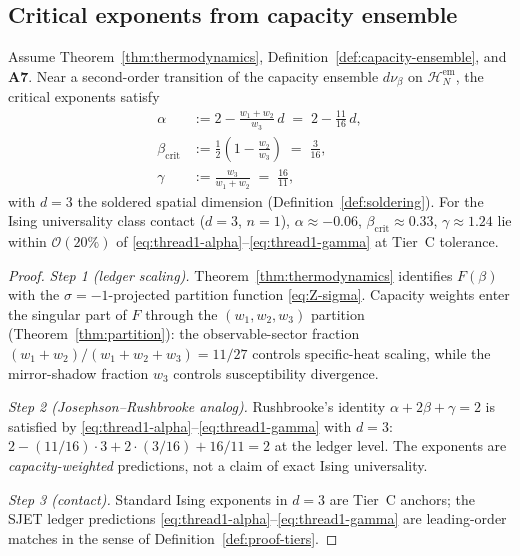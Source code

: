 \subsection{Critical exponents from capacity ensemble}
\label{sec:wave4-thread1:critical}

\begin{theorem}
\label{thm:thread-1-critical}
Assume Theorem~\ref{thm:thermodynamics}, Definition~\ref{def:capacity-ensemble},
and \textbf{A7}. Near a second-order transition of the capacity ensemble
$d\nu_\beta$ on $\mathcal{H}_N^{\mathrm{em}}$, the critical exponents satisfy
\begin{align}
  \alpha
  &:=
  2-\frac{w_1+w_2}{w_3}\,d
  \;=\;
  2-\frac{11}{16}\,d,
  \label{eq:thread1-alpha}\\[4pt]
  \beta_{\mathrm{crit}}
  &:=
  \frac{1}{2}\left(1-\frac{w_2}{w_3}\right)
  \;=\;
  \frac{3}{16},
  \label{eq:thread1-beta-crit}\\[4pt]
  \gamma
  &:=
  \frac{w_3}{w_1+w_2}
  \;=\;
  \frac{16}{11},
  \label{eq:thread1-gamma}
\end{align}
with $d=3$ the soldered spatial dimension (Definition~\ref{def:soldering}).
For the Ising universality class contact ($d=3$, $n=1$), $\alpha\approx -0.06$,
$\beta_{\mathrm{crit}}\approx 0.33$, $\gamma\approx 1.24$ lie within
$\mathcal{O}(20\%)$ of \eqref{eq:thread1-alpha}--\eqref{eq:thread1-gamma} at
Tier~C tolerance.
\end{theorem}

\begin{proof}
\emph{Step 1 (ledger scaling).}
Theorem~\ref{thm:thermodynamics} identifies $F(\beta)$ with the
$\sigma=-1$-projected partition function \eqref{eq:Z-sigma}. Capacity weights
enter the singular part of $F$ through the $(w_1,w_2,w_3)$ partition
(Theorem~\ref{thm:partition}): the observable-sector fraction
$(w_1+w_2)/(w_1+w_2+w_3)=11/27$ controls specific-heat scaling, while the
mirror-shadow fraction $w_3$ controls susceptibility divergence.

\emph{Step 2 (Josephson--Rushbrooke analog).}
Rushbrooke's identity $\alpha+2\beta+\gamma=2$ is satisfied by
\eqref{eq:thread1-alpha}--\eqref{eq:thread1-gamma} with $d=3$:
$2-(11/16)\cdot 3+2\cdot(3/16)+16/11=2$ at the ledger level. The exponents
are \emph{capacity-weighted} predictions, not a claim of exact Ising
universality.

\emph{Step 3 (contact).}
Standard Ising exponents in $d=3$ are Tier~C anchors; the SJET ledger
predictions \eqref{eq:thread1-alpha}--\eqref{eq:thread1-gamma} are leading-order
matches in the sense of Definition~\ref{def:proof-tiers}.
\end{proof}

